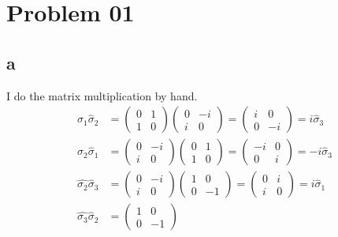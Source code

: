 \documentclass[letter]{article}
\author{Ahmed Saad Sabit, Rice University}
\date{\today}
\begin{document}
\maketitle


\section*{Problem 01}
\subsection*{a} 
I do the matrix multiplication by hand. 
\begin{align*}
	\hat{\sigma}_1 \hat{\sigma}_2  &= \begin{pmatrix} 0&1\\1&0 \end{pmatrix} 
	\begin{pmatrix} 0&-i\\i&0 \end{pmatrix}  =
	\begin{pmatrix} i&0\\0&-i \end{pmatrix} = i \hat{\sigma}_3 \\ 
	\hat{\sigma}_2 \hat{\sigma}_1 &= \begin{pmatrix} 0&-i\\i&0 \end{pmatrix} 
	\begin{pmatrix} 0&1\\1&0 \end{pmatrix} = \begin{pmatrix} -i&0\\0&i \end{pmatrix} = - i \hat{\sigma}_3 \\
	\hat{\sigma_2}\hat{\sigma}_3 &= \begin{pmatrix} 0&-i\\i&0 \end{pmatrix} 
	\begin{pmatrix} 1&0\\0&-1 \end{pmatrix} = 
	\begin{pmatrix} 0&i\\i&0 \end{pmatrix} = i \hat{\sigma}_1
	\\ \hat{\sigma_3}\hat{\sigma}_2 &= 	\begin{pmatrix} 1&0\\0&-1 \end{pmatrix}  

\end{align*}
\end{document}

